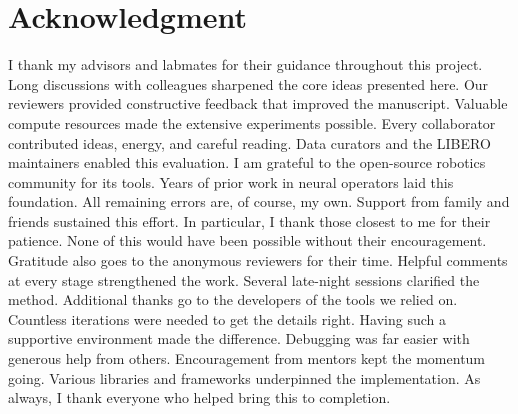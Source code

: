 \documentclass[conference]{IEEEtran}
\begin{document}
\section*{Acknowledgment}
I thank my advisors and labmates for their guidance throughout this project.
Long discussions with colleagues sharpened the core ideas presented here.
Our reviewers provided constructive feedback that improved the manuscript.
Valuable compute resources made the extensive experiments possible.
Every collaborator contributed ideas, energy, and careful reading.
Data curators and the LIBERO maintainers enabled this evaluation.
I am grateful to the open-source robotics community for its tools.
Years of prior work in neural operators laid this foundation.
All remaining errors are, of course, my own.
Support from family and friends sustained this effort.
In particular, I thank those closest to me for their patience.
None of this would have been possible without their encouragement.
Gratitude also goes to the anonymous reviewers for their time.
Helpful comments at every stage strengthened the work.
Several late-night sessions clarified the method.
Additional thanks go to the developers of the tools we relied on.
Countless iterations were needed to get the details right.
Having such a supportive environment made the difference.
Debugging was far easier with generous help from others.
Encouragement from mentors kept the momentum going.
Various libraries and frameworks underpinned the implementation.
As always, I thank everyone who helped bring this to completion.



\end{document}
